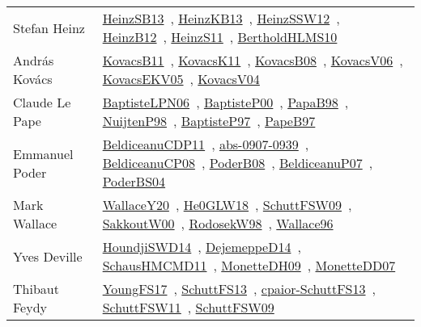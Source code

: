 {\begin{longtable}{p{4cm}p{20cm}}
Stefan Heinz & \href{articles/HeinzSB13.pdf}{HeinzSB13}~\cite{HeinzSB13}, \href{papers/HeinzKB13.pdf}{HeinzKB13}~\cite{HeinzKB13}, \href{articles/HeinzSSW12.pdf}{HeinzSSW12}~\cite{HeinzSSW12}, \href{papers/HeinzB12.pdf}{HeinzB12}~\cite{HeinzB12}, \href{papers/HeinzS11.pdf}{HeinzS11}~\cite{HeinzS11}, \href{papers/BertholdHLMS10.pdf}{BertholdHLMS10}~\cite{BertholdHLMS10}\\
Andr{\'{a}}s Kov{\'{a}}cs & \href{articles/KovacsB11.pdf}{KovacsB11}~\cite{KovacsB11}, \href{articles/KovacsK11.pdf}{KovacsK11}~\cite{KovacsK11}, \href{articles/KovacsB08.pdf}{KovacsB08}~\cite{KovacsB08}, \href{papers/KovacsV06.pdf}{KovacsV06}~\cite{KovacsV06}, \href{papers/KovacsEKV05.pdf}{KovacsEKV05}~\cite{KovacsEKV05}, \href{papers/KovacsV04.pdf}{KovacsV04}~\cite{KovacsV04}\\
Claude Le Pape & \href{}{BaptisteLPN06}~\cite{BaptisteLPN06}, \href{articles/BaptisteP00.pdf}{BaptisteP00}~\cite{BaptisteP00}, \href{articles/PapaB98.pdf}{PapaB98}~\cite{PapaB98}, \href{articles/NuijtenP98.pdf}{NuijtenP98}~\cite{NuijtenP98}, \href{papers/BaptisteP97.pdf}{BaptisteP97}~\cite{BaptisteP97}, \href{}{PapeB97}~\cite{PapeB97}\\
Emmanuel Poder & \href{articles/BeldiceanuCDP11.pdf}{BeldiceanuCDP11}~\cite{BeldiceanuCDP11}, \href{articles/abs-0907-0939.pdf}{abs-0907-0939}~\cite{abs-0907-0939}, \href{papers/BeldiceanuCP08.pdf}{BeldiceanuCP08}~\cite{BeldiceanuCP08}, \href{papers/PoderB08.pdf}{PoderB08}~\cite{PoderB08}, \href{papers/BeldiceanuP07.pdf}{BeldiceanuP07}~\cite{BeldiceanuP07}, \href{articles/PoderBS04.pdf}{PoderBS04}~\cite{PoderBS04}\\
Mark Wallace & \href{articles/WallaceY20.pdf}{WallaceY20}~\cite{WallaceY20}, \href{papers/He0GLW18.pdf}{He0GLW18}~\cite{He0GLW18}, \href{papers/SchuttFSW09.pdf}{SchuttFSW09}~\cite{SchuttFSW09}, \href{articles/SakkoutW00.pdf}{SakkoutW00}~\cite{SakkoutW00}, \href{papers/RodosekW98.pdf}{RodosekW98}~\cite{RodosekW98}, \href{articles/Wallace96.pdf}{Wallace96}~\cite{Wallace96}\\
Yves Deville & \href{papers/HoundjiSWD14.pdf}{HoundjiSWD14}~\cite{HoundjiSWD14}, \href{papers/DejemeppeD14.pdf}{DejemeppeD14}~\cite{DejemeppeD14}, \href{articles/SchausHMCMD11.pdf}{SchausHMCMD11}~\cite{SchausHMCMD11}, \href{papers/MonetteDH09.pdf}{MonetteDH09}~\cite{MonetteDH09}, \href{papers/MonetteDD07.pdf}{MonetteDD07}~\cite{MonetteDD07}\\
Thibaut Feydy & \href{papers/YoungFS17.pdf}{YoungFS17}~\cite{YoungFS17}, \href{papers/SchuttFS13.pdf}{SchuttFS13}~\cite{SchuttFS13}, \href{papers/cpaior-SchuttFS13.pdf}{cpaior-SchuttFS13}~\cite{cpaior-SchuttFS13}, \href{articles/SchuttFSW11.pdf}{SchuttFSW11}~\cite{SchuttFSW11}, \href{papers/SchuttFSW09.pdf}{SchuttFSW09}~\cite{SchuttFSW09}\\

\end{longtable}}
